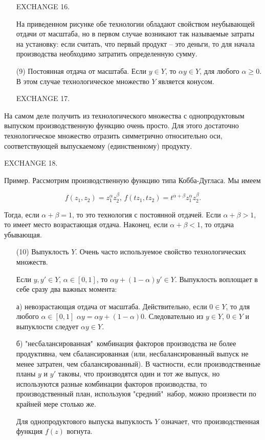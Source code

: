 \begin{itemize}
EXCHANGE 16.

На приведенном рисунке обе технологии обладают свойством неубывающей отдачи от
масштаба, но в первом случае возникают так называемые затраты на установку:
если считать, что первый продукт -- это деньги, то для начала производства
необходимо затратить определенную сумму.


\item[(9)] Постоянная отдача от масштаба. Если $y\in Y$, то $\alpha y\in Y$, для
любого $\alpha\ge 0$. В этом случае технологическое множество $Y$ является конусом.

EXCHANGE 17.

\end{itemize}

На самом деле получить из технологического множества  с
однопродуктовым выпуском производственную функцию очень просто.
Для этого достаточно технологическое множество отразить
симметрично относительно оси, соответствующей выпускаемому
(единственному) продукту.

EXCHANGE 18.

Пример. Рассмотрим производственную функцию типа Кобба-Дугласа.
Мы имеем

$$f(z_1,z_2)=z_1^\alpha z_2^\beta,\, f(tz_1,tz_2)=t^{{\alpha
+\beta}}z_1^\alpha z_2^\beta.$$

Тогда, если $\alpha +\beta=1$, то это технология с постоянной отдачей.
Если $\alpha +\beta>1$, то имеет место возрастающая отдача.
Наконец, если $\alpha +\beta<1$, то  отдача убывающая.

\begin{itemize}
\item[(10)] Выпуклость $Y$. Очень часто используемое свойство технологических множеств.

Если $y,y'\in Y$, $\alpha\in [0,1]$, то $\alpha y+(1-\alpha) y'\in
Y$. Выпуклость воплощает в себе сразу два важных момента:

а) невозрастающая отдача от масштаба. Действительно, если $0\in
Y$, то для любого $\alpha\in [0,1]$ $\alpha y=\alpha y+(1-\alpha
)0$. Следовательно из $y\in Y$, $0\in Y$ и выпуклости следует
$\alpha y\in Y$.

б) "несбалансированная"\, комбинация факторов производства не более
продуктивна, чем сбалансированная (или,
несбалансированный выпуск не менее затратен, чем
сбалансированный). В частности, если производственные планы $y$  и
$y'$ таковы, что производятся один и тот же выпуск, но используются разные комбинации
факторов производства, то производственный план, используюя
"средний"\, набор, можно произвести по крайней мере столько же.

Для однопродуктового выпуска выпуклость $Y$ означает, что
производственная функция $f(z)$ вогнута.

\end{itemize}

